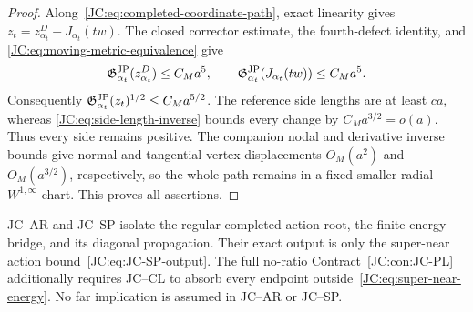 \begin{proof}
Along~\eqref{JC:eq:completed-coordinate-path}, exact linearity gives
$z_t=z_{\alpha_t}^D+J_{\alpha_t}(tw)$.  The closed corrector estimate,
the fourth-defect identity, and
\eqref{JC:eq:moving-metric-equivalence} give
\[
 \mathfrak G^{\rm JP}_{\alpha_t}(z_{\alpha_t}^D)\le C_Ma^5,
 \qquad
 \mathfrak G^{\rm JP}_{\alpha_t}(J_{\alpha_t}(tw))\le C_Ma^5.
\]
Consequently $\mathfrak G^{\rm JP}_{\alpha_t}(z_t)^{1/2}\le C_Ma^{5/2}$.
The reference side lengths are at least $ca$, whereas
\eqref{JC:eq:side-length-inverse} bounds every change by
$C_Ma^{3/2}=o(a)$.  Thus every side remains positive.  The companion
nodal and derivative inverse bounds give normal and tangential vertex
displacements $O_M(a^2)$ and $O_M(a^{3/2})$, respectively, so the whole
path remains in a fixed smaller radial $W^{1,\infty}$ chart.  This proves
all assertions.
\end{proof}

\begin{remark}
JC--AR and JC--SP isolate the regular completed-action root, the finite
energy bridge, and its diagonal propagation.  Their exact output is only
the super-near action bound~\eqref{JC:eq:JC-SP-output}.  The full no-ratio
Contract~\ref{JC:con:JC-PL} additionally requires JC--CL to absorb every
endpoint outside~\eqref{JC:eq:super-near-energy}.  No far implication is
assumed in JC--AR or JC--SP.
\end{remark}


